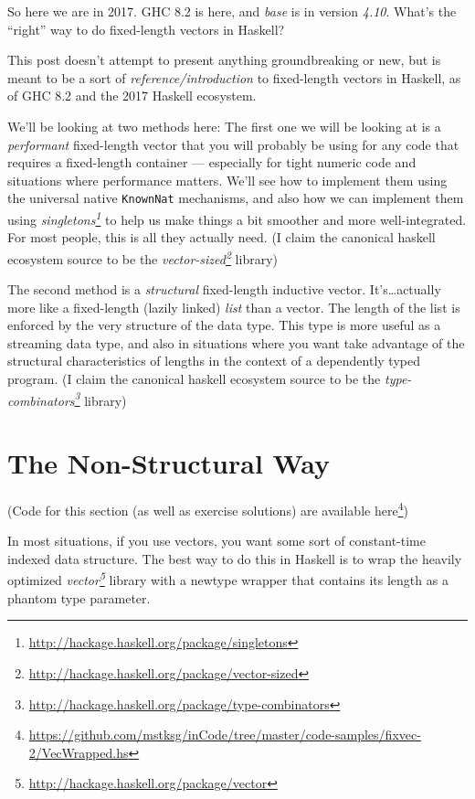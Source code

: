 \documentclass[]{article}
\renewcommand{\href}[2]{#2\footnote{\url{#1}}}
\begin{document}
So here we are in 2017. GHC 8.2 is here, and \emph{base} is in version
\emph{4.10}. What's the ``right'' way to do fixed-length vectors in Haskell?

This post doesn't attempt to present anything groundbreaking or new, but is
meant to be a sort of \emph{reference/introduction} to fixed-length vectors in
Haskell, as of GHC 8.2 and the 2017 Haskell ecosystem.

We'll be looking at two methods here: The first one we will be looking at is a
\emph{performant} fixed-length vector that you will probably be using for any
code that requires a fixed-length container --- especially for tight numeric
code and situations where performance matters. We'll see how to implement them
using the universal native \texttt{KnownNat} mechanisms, and also how we can
implement them using
\emph{\href{http://hackage.haskell.org/package/singletons}{singletons}} to help
us make things a bit smoother and more well-integrated. For most people, this is
all they actually need. (I claim the canonical haskell ecosystem source to be
the \emph{\href{http://hackage.haskell.org/package/vector-sized}{vector-sized}}
library)

The second method is a \emph{structural} fixed-length inductive vector.
It's\ldots actually more like a fixed-length (lazily linked) \emph{list} than a
vector. The length of the list is enforced by the very structure of the data
type. This type is more useful as a streaming data type, and also in situations
where you want take advantage of the structural characteristics of lengths in
the context of a dependently typed program. (I claim the canonical haskell
ecosystem source to be the
\emph{\href{http://hackage.haskell.org/package/type-combinators}{type-combinators}}
library)

\section{The Non-Structural Way}\label{the-non-structural-way}

(Code for this section (as well as exercise solutions) are
\href{https://github.com/mstksg/inCode/tree/master/code-samples/fixvec-2/VecWrapped.hs}{available
here})

In most situations, if you use vectors, you want some sort of constant-time
indexed data structure. The best way to do this in Haskell is to wrap the
heavily optimized
\emph{\href{http://hackage.haskell.org/package/vector}{vector}} library with a
newtype wrapper that contains its length as a phantom type parameter.
\end{document}

